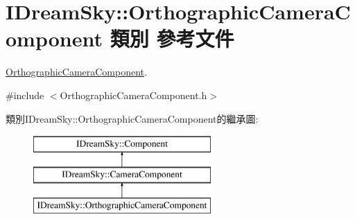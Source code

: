 \hypertarget{class_i_dream_sky_1_1_orthographic_camera_component}{}\section{I\+Dream\+Sky\+:\+:Orthographic\+Camera\+Component 類別 參考文件}
\label{class_i_dream_sky_1_1_orthographic_camera_component}


\hyperlink{class_i_dream_sky_1_1_orthographic_camera_component}{Orthographic\+Camera\+Component}.  




{\ttfamily \#include $<$Orthographic\+Camera\+Component.\+h$>$}

類別\+I\+Dream\+Sky\+:\+:Orthographic\+Camera\+Component的繼承圖\+:\begin{figure}[H]
\begin{center}
\leavevmode
\includegraphics[height=3.000000cm]{class_i_dream_sky_1_1_orthographic_camera_component}
\end{center}
\end{figure}
